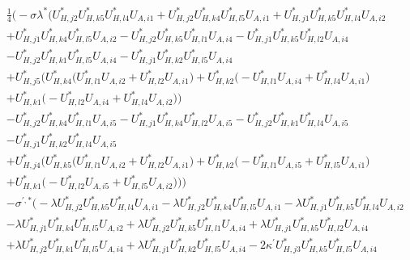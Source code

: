 \begin{align} 
 &\frac{1}{4} \Big(- \sigma \lambda^* \Big(U^*_{{H},{j 2}} U^*_{{H},{k 5}} U^*_{{H},{l 4}} U_{A,{i 1}} +U^*_{{H},{j 2}} U^*_{{H},{k 4}} U^*_{{H},{l 5}} U_{A,{i 1}} +U^*_{{H},{j 1}} U^*_{{H},{k 5}} U^*_{{H},{l 4}} U_{A,{i 2}} \nonumber \\ 
 &+U^*_{{H},{j 1}} U^*_{{H},{k 4}} U^*_{{H},{l 5}} U_{A,{i 2}} - U^*_{{H},{j 2}} U^*_{{H},{k 5}} U^*_{{H},{l 1}} U_{A,{i 4}} - U^*_{{H},{j 1}} U^*_{{H},{k 5}} U^*_{{H},{l 2}} U_{A,{i 4}} \nonumber \\ 
 &- U^*_{{H},{j 2}} U^*_{{H},{k 1}} U^*_{{H},{l 5}} U_{A,{i 4}} - U^*_{{H},{j 1}} U^*_{{H},{k 2}} U^*_{{H},{l 5}} U_{A,{i 4}} \nonumber \\ 
 &+U^*_{{H},{j 5}} \Big(U^*_{{H},{k 4}} \Big(U^*_{{H},{l 1}} U_{A,{i 2}}  + U^*_{{H},{l 2}} U_{A,{i 1}} \Big)+U^*_{{H},{k 2}} \Big(- U^*_{{H},{l 1}} U_{A,{i 4}}  + U^*_{{H},{l 4}} U_{A,{i 1}} \Big)\nonumber \\ 
 &+U^*_{{H},{k 1}} \Big(- U^*_{{H},{l 2}} U_{A,{i 4}}  + U^*_{{H},{l 4}} U_{A,{i 2}} \Big)\Big)\nonumber \\ 
 &- U^*_{{H},{j 2}} U^*_{{H},{k 4}} U^*_{{H},{l 1}} U_{A,{i 5}} - U^*_{{H},{j 1}} U^*_{{H},{k 4}} U^*_{{H},{l 2}} U_{A,{i 5}} - U^*_{{H},{j 2}} U^*_{{H},{k 1}} U^*_{{H},{l 4}} U_{A,{i 5}} \nonumber \\ 
 &- U^*_{{H},{j 1}} U^*_{{H},{k 2}} U^*_{{H},{l 4}} U_{A,{i 5}} \nonumber \\ 
 &+U^*_{{H},{j 4}} \Big(U^*_{{H},{k 5}} \Big(U^*_{{H},{l 1}} U_{A,{i 2}}  + U^*_{{H},{l 2}} U_{A,{i 1}} \Big)+U^*_{{H},{k 2}} \Big(- U^*_{{H},{l 1}} U_{A,{i 5}}  + U^*_{{H},{l 5}} U_{A,{i 1}} \Big)\nonumber \\ 
 &+U^*_{{H},{k 1}} \Big(- U^*_{{H},{l 2}} U_{A,{i 5}}  + U^*_{{H},{l 5}} U_{A,{i 2}} \Big)\Big)\Big)\nonumber \\ 
 &- \sigma^{\prime,*} \Big(- \lambda U^*_{{H},{j 2}} U^*_{{H},{k 5}} U^*_{{H},{l 4}} U_{A,{i 1}} - \lambda U^*_{{H},{j 2}} U^*_{{H},{k 4}} U^*_{{H},{l 5}} U_{A,{i 1}} - \lambda U^*_{{H},{j 1}} U^*_{{H},{k 5}} U^*_{{H},{l 4}} U_{A,{i 2}} \nonumber \\ 
 &- \lambda U^*_{{H},{j 1}} U^*_{{H},{k 4}} U^*_{{H},{l 5}} U_{A,{i 2}} +\lambda U^*_{{H},{j 2}} U^*_{{H},{k 5}} U^*_{{H},{l 1}} U_{A,{i 4}} +\lambda U^*_{{H},{j 1}} U^*_{{H},{k 5}} U^*_{{H},{l 2}} U_{A,{i 4}} \nonumber \\ 
 &+\lambda U^*_{{H},{j 2}} U^*_{{H},{k 1}} U^*_{{H},{l 5}} U_{A,{i 4}} +\lambda U^*_{{H},{j 1}} U^*_{{H},{k 2}} U^*_{{H},{l 5}} U_{A,{i 4}} -2 \kappa^\prime U^*_{{H},{j 3}} U^*_{{H},{k 5}} U^*_{{H},{l 5}} U_{A,{i 4}} \nonumber \\ 

\end{align}
